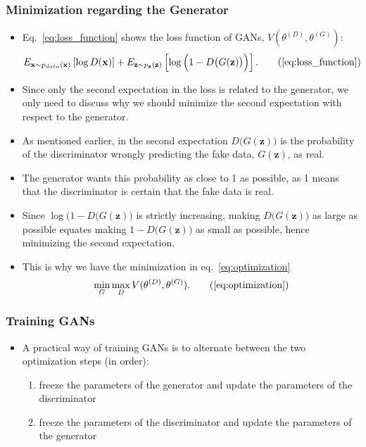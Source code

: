 \documentclass{beamer}
\begin{document}
\begin{frame}
\setlength{\leftmargini}{0.3cm}
\setlength{\leftmarginii}{0.6cm}
\setlength{\leftmarginiii}{0.9cm}
\frametitle{Minimization regarding the Generator}
\begin{itemize}
\footnotesize
\item Eq.~\eqref{eq:loss_function} shows the loss function of GANs, $V(\theta^{(D)}, \theta^{(G)})$:
\begin{equation}
E_{\mathbf{x}\sim p_{data}(\mathbf{x})}\left[\log D(\mathbf{x}) \right] + E_{\mathbf{z}\sim p_{\mathbf{z}}(\mathbf{z})}\left[\log \Big(1 - D \big(G(\mathbf{z}) \big) \Big) \right].
\tag{\ref{eq:loss_function}}
\end{equation}
\item Since only the second expectation in the loss is related to the generator, we only need to discuss why we should minimize the second expectation with respect to the generator.
\item As mentioned earlier, in the second expectation $D\big(G(\mathbf{z}) \big)$ is the probability of the discriminator wrongly predicting the fake data, $G(\mathbf{z})$, as real.
\item The generator wants this probability as close to 1 as possible, as 1 means that the discriminator is certain that the fake data is real.
\item Since $\log \Big(1 - D \big(G(\mathbf{z}) \Big)$ is strictly increasing, making $D\big(G(\mathbf{z}) \big)$ as large as possible equates making $1 - D \big(G(\mathbf{z})\big)$ as small as possible, hence minimizing the second expectation.
\item This is why we have the minimization in eq.~\eqref{eq:optimization}
\begin{equation}
\min_{G} \max_{D} V(\theta^{(D)}, \theta^{(G)}).
\tag{\ref{eq:optimization}}
\end{equation}
\end{itemize}
\end{frame}

\begin{frame}
\setlength{\leftmargini}{0.3cm}
\setlength{\leftmarginii}{0.6cm}
\setlength{\leftmarginiii}{0.9cm}
\frametitle{Training GANs}
\begin{itemize}
\item A practical way of training GANs is to alternate between the two optimization steps (in order):
	\begin{enumerate}
	\item freeze the parameters of the generator and update the parameters of the discriminator
	\item freeze the parameters of the discriminator and update the parameters of the generator
	\end{enumerate}
\end{itemize}
\end{frame}
\end{document}
